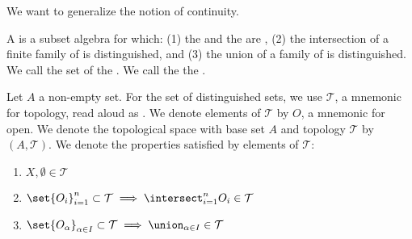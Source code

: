 
\sbasic



\sstart



We want to generalize the notion of
continuity.


A  is
a subset algebra for which:
(1) the 
and the 
are ,
(2) the intersection of a finite family of
is distinguished, and
(3)
the union of a family of
is distinguished.
We call the set of
the .
We call the
the .

Let $A$ a non-empty set.
For the set of distinguished sets, we use $\mathcal{T}$,
a mnemonic for topology, read aloud as .
We denote elements of $\mathcal{T}$ by $O$, a mnemonic
for open.
We denote the topological space with base set $A$ and
topology $\mathcal{T}$ by $(A, \mathcal{T})$.
We denote the properties satisfied by elements of
$\mathcal{T}$:
\begin{enumerate}

  \item
  $X,\emptyset \in \mathcal{T}$

  \item
  $\set{O_i}_{i = 1}^{n} \subset \mathcal{T}
  \implies
  \intersect_{i = 1}^{n} O_i \in \mathcal{T}$

  \item
  $\set{O_\alpha}_{\alpha \in I} \subset \mathcal{T}
  \implies
  \union_{\alpha \in I} \in \mathcal{T}$


\end{enumerate}

\strats
